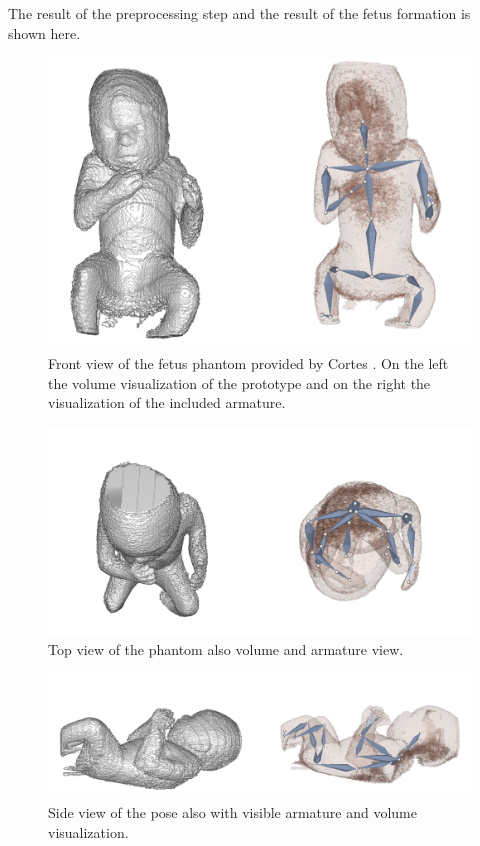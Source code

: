 The result of the preprocessing step and the result of the fetus formation is shown here.
\begin{figure} [htb!]
    \centering
	\includegraphics[width=13cm]{content/images/results/fetusPhantomFront.png}
	\caption{Front view of the fetus phantom provided by Cortes \cite{Cortes2016UltrasoundEvaluation}. On the left the volume visualization of the prototype and on the right the visualization of the included armature.}
	\label{fig:}
\end{figure}
\begin{figure} [htb!]
    \centering
	\includegraphics[width=13cm]{content/images/results/fetusPhantomTop.png}
	\caption{Top view of the phantom also volume and armature view.}
	\label{fig:}
\end{figure}
\begin{figure} [htb!]
    \centering
	\includegraphics[width=15cm]{content/images/results/fetusPhantomSide.png}
	\caption{Side view of the pose also with visible armature and volume visualization.}
	\label{fig:}
\end{figure}
